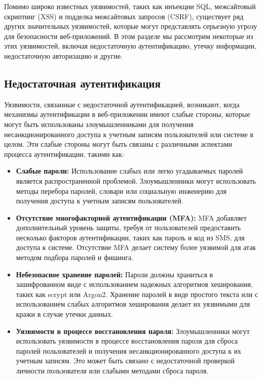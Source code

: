 \documentclass[a4paper,12pt]{diplom}
\begin{document}
	 Помимо широко известных уязвимостей, таких как инъекции SQL, межсайтовый скриптинг (XSS) и подделка межсайтовых запросов (CSRF), существует ряд других значительных уязвимостей, которые могут представлять серьезную угрозу для безопасности веб-приложений. В этом разделе мы рассмотрим некоторые из этих уязвимостей, включая недостаточную аутентификацию, утечку информации, недостаточную авторизацию и другие.
	 
	 \subsection{Недостаточная аутентификация}
	 
	 Уязвимости, связанные с недостаточной аутентификацией, возникают, когда механизмы аутентификации в веб-приложении имеют слабые стороны, которые могут быть использованы злоумышленниками для получения несанкционированного доступа к учетным записям пользователей или системе в целом. Эти слабые стороны могут быть связаны с различными аспектами процесса аутентификации, такими как:
	 
	 \begin{itemize}
	 	\item \textbf{Слабые пароли:} Использование слабых или легко угадываемых паролей является распространенной проблемой. Злоумышленники могут использовать методы перебора паролей, словари или социальную инженерию для получения доступа к учетным записям пользователей.
	 	\item \textbf{Отсутствие многофакторной аутентификации (MFA):} MFA добавляет дополнительный уровень защиты, требуя от пользователей предоставить несколько факторов аутентификации, таких как пароль и код из SMS, для доступа к системе. Отсутствие MFA делает систему более уязвимой для атак методом подбора паролей и фишинга.
	 	\item \textbf{Небезопасное хранение паролей:}  Пароли должны храниться в зашифрованном виде с использованием надежных алгоритмов хеширования, таких как scrypt или Argon2. Хранение паролей в виде простого текста или с использованием слабых алгоритмов хеширования делает их уязвимыми для кражи в случае утечки данных.
	 	\item \textbf{Уязвимости в процессе восстановления пароля:}  Злоумышленники могут использовать уязвимости в процессе восстановления пароля для сброса паролей пользователей и получения несанкционированного доступа к их учетным записям. Это может быть связано с недостаточной проверкой личности пользователя или слабыми методами сброса пароля.
	 \end{itemize}
	 
\end{document}
